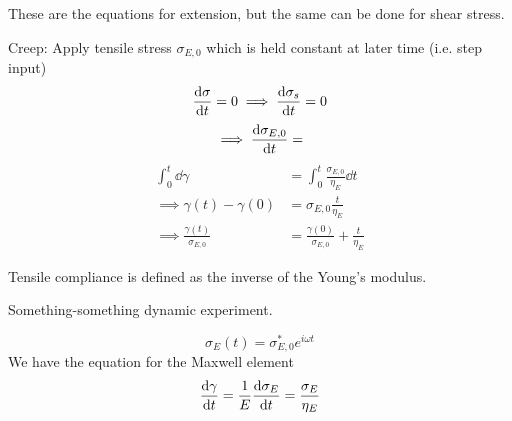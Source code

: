 \documentclass[a4paper]{article}
\begin{document}
These are the equations for extension, but the same can be done for
shear stress.

Creep: Apply tensile stress $\sigma_{E,0}$ which is held
		constant at later time (i.e. step input)
\begin{equation}
	\dv{\sigma}{t} = 0 \implies \dv{\sigma_s}{t} = 0
\end{equation}
\begin{equation}
	\implies \dv{\sigma_{E,0}}{t} = %
\end{equation}
\begin{equation}
	\begin{split}
		\int_0^t \dd \gamma &= \int_0^t \frac{\sigma_{E,0}}{\eta_E}\dd t \\
		\implies \gamma(t) - \gamma(0) &= \sigma_{E,0}\frac{t}{\eta_E} \\
		\implies \frac{\gamma(t)}{\sigma_{E,0}} &= \frac{\gamma(0)}{\sigma_{E,0}} + \frac{t}{\eta_E} 
	\end{split}
\end{equation}

Tensile compliance is defined as the inverse of the Young's modulus.

Something-something dynamic experiment.

\begin{equation}
	\sigma_E(t) = \sigma^{*}_{E,0}e^{i\omega t}
\end{equation}
We have the equation for the Maxwell element
\begin{equation}
	\dv{\gamma}{t} = \frac{1}{E} \dv{\sigma_E}{t} = \frac{\sigma_E}{\eta_E}
\end{equation}
\end{document}
